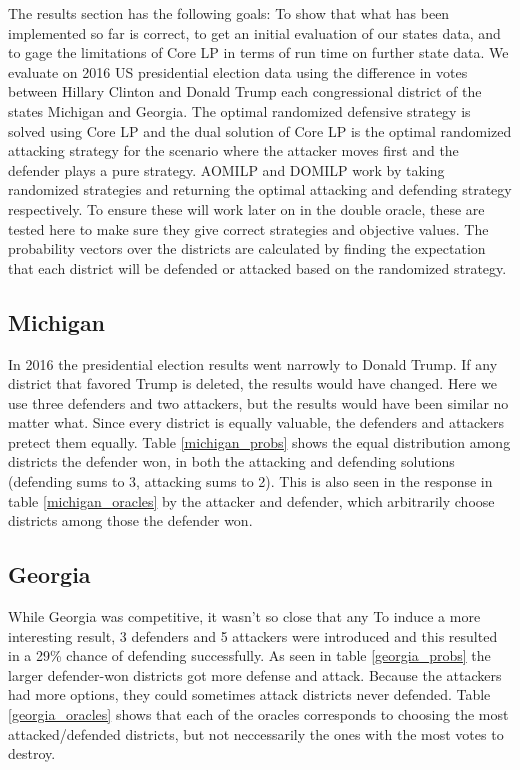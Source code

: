 \documentclass[letterpaper]{article} %
\begin{document}
The results section has the following goals: To show that what has been implemented so far is correct, to get an initial evaluation of our states data, and to gage the limitations of Core LP in terms of run time on further state data. We evaluate on 2016 US presidential election data using the difference in votes between Hillary Clinton and Donald Trump each congressional district of the states Michigan and Georgia. The optimal randomized defensive strategy is solved using Core LP and the dual solution of Core LP is the optimal randomized attacking strategy for the scenario where the attacker moves first and the defender plays a pure strategy. AOMILP and DOMILP work by taking randomized strategies and returning the optimal attacking and defending strategy respectively. To ensure these will work later on in the double oracle, these are tested here to make sure they give correct strategies and objective values. The probability vectors over the districts are calculated by finding the expectation that each district will be defended or attacked based on the randomized strategy.

\subsection{Michigan}

In 2016 the presidential election results went narrowly to Donald Trump. If any district that favored Trump is deleted, the results would have changed. Here we use three defenders and two attackers, but the results would have been similar no matter what. Since every district is equally valuable, the defenders and attackers pretect them equally. Table \ref{michigan_probs} shows the equal distribution among districts the defender won, in both the attacking and defending solutions (defending sums to 3, attacking sums to 2). This is also seen in the response in table \ref{michigan_oracles} by the attacker and defender, which arbitrarily choose districts among those the defender won. 

\subsection{Georgia}

While Georgia was competitive, it wasn't so close that any To induce a more interesting result, 3 defenders and 5 attackers were introduced and this resulted in a 29\% chance of defending successfully. As seen in table \ref{georgia_probs} the larger defender-won districts got more defense and attack. Because the attackers had more options, they could sometimes attack districts never defended. Table \ref{georgia_oracles} shows that each of the oracles corresponds to choosing the most attacked/defended districts, but not neccessarily the ones with the most votes to destroy. 
\end{document}
